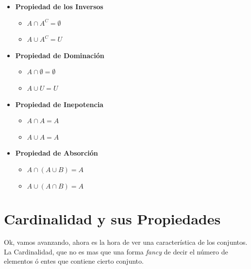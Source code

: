 \documentclass[12pt, fleqn]{report}                             %
\theoremstyle{break}                                            %
\begin{document}
\begin{itemize}
                \item \textbf{Propiedad de los Inversos}
                    \begin{itemize}
                        \item $A \cap A^C = \emptyset$
                        \item $A \cup A^C = U$
                    \end{itemize}

                \item \textbf{Propiedad de Dominación}
                    \begin{itemize}
                        \item $A \cap \emptyset = \emptyset$
                        \item $A \cup U = U$
                    \end{itemize}

                \item \textbf{Propiedad de Inepotencia}
                    \begin{itemize}
                        \item $A \cap A = A$
                        \item $A \cup A = A$
                    \end{itemize}

                \item \textbf{Propiedad de Absorción}
                    \begin{itemize}
                        \item $A \cap (A \cup B) = A$
                        \item $A \cup (A \cap B) = A$
                    \end{itemize}

            \end{itemize}





        \clearpage
        \section{Cardinalidad y sus Propiedades}
                
            Ok, vamos avanzando, ahora es la hora de ver una característica de los conjuntos.
            La Cardinalidad, que no es mas que una forma \emph{fancy} de decir el número de 
            elementos ó entes que contiene cierto conjunto.
\end{document}
